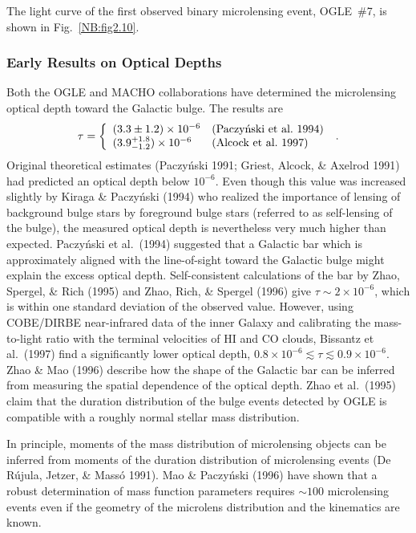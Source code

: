 \documentclass[a4paper,10pt]{article} %
\newcommand{\la}{\lesssim}
\begin{document}
The light curve of the first observed binary microlensing event,
OGLE~\#7, is shown in Fig.\ \ref{NB:fig2.10}.

\subsubsection{Early Results on Optical Depths}
\label{NB:subsubsect2.2.3}

Both the OGLE and MACHO collaborations have determined the
microlensing optical depth toward the Galactic bulge. The results are
\begin{equation}
  \tau = \left\{
  \begin{array}{ll}
    (3.3\pm1.2)\times10^{-6} & \hbox{(Paczy\'nski et al.\ 1994)} \\
    (3.9^{+1.8}_{-1.2})\times10^{-6} & \hbox{(Alcock et al.\ 1997)} \\
  \end{array}\right.\;.
\label{eq:2.35}
\end{equation}
Original theoretical estimates (Paczy\'nski 1991; Griest, Alcock, \&
Axelrod 1991) had predicted an optical depth below $10^{-6}$. Even
though this value was increased slightly by Kiraga \& Paczy\'nski
(1994) who realized the importance of lensing of background bulge
stars by foreground bulge stars (referred to as self-lensing of the
bulge), the measured optical depth is nevertheless very much higher
than expected. Paczy\'nski et al.\ (1994) suggested that a Galactic
bar which is approximately aligned with the line-of-sight toward the
Galactic bulge might explain the excess optical depth. Self-consistent
calculations of the bar by Zhao, Spergel, \& Rich (1995) and Zhao,
Rich, \& Spergel (1996) give $\tau\sim2\times10^{-6}$, which is within
one standard deviation of the observed value. However, using
COBE/DIRBE near-infrared data of the inner Galaxy and calibrating the
mass-to-light ratio with the terminal velocities of HI and CO clouds,
Bissantz et al.\ (1997) find a significantly lower optical depth,
$0.8\times10^{-6}\la\tau\la0.9\times10^{-6}$. Zhao \& Mao (1996)
describe how the shape of the Galactic bar can be inferred from
measuring the spatial dependence of the optical depth. Zhao et al.\
(1995) claim that the duration distribution of the bulge events
detected by OGLE is compatible with a roughly normal stellar mass
distribution.

In principle, moments of the mass distribution of microlensing objects
can be inferred from moments of the duration distribution of
microlensing events (De R\'ujula, Jetzer, \& Mass\'o 1991). Mao \&
Paczy\'nski (1996) have shown that a robust determination of mass
function parameters requires $\sim100$ microlensing events even if the
geometry of the microlens distribution and the kinematics are known.
\end{document}
